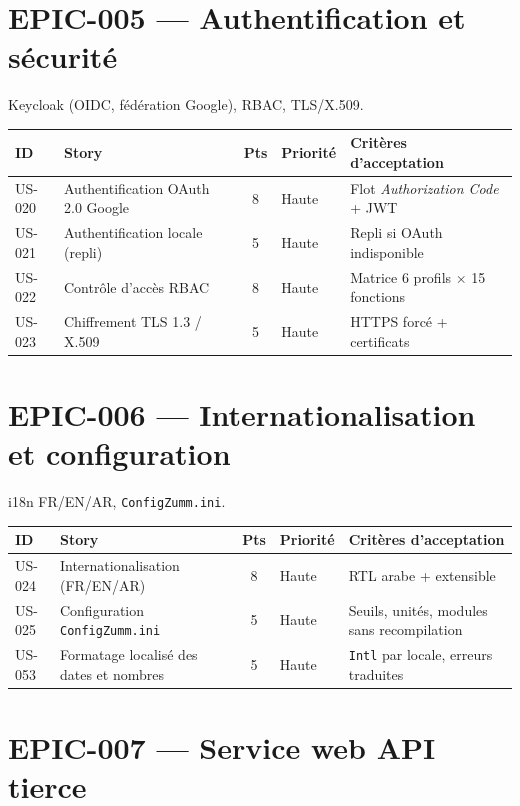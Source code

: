 \section{EPIC-005 --- Authentification et sécurité}

Keycloak (OIDC, fédération Google), RBAC, TLS/X.509.

\begin{center}
\begin{tabular}{lp{6.6cm}cl p{4.6cm}}
\toprule
\textbf{ID} & \textbf{Story} & \textbf{Pts} & \textbf{Priorité} & \textbf{Critères d'acceptation} \\
\midrule
US-020 & Authentification OAuth 2.0 Google & 8 & Haute & Flot \emph{Authorization Code} + JWT \\
US-021 & Authentification locale (repli)   & 5 & Haute & Repli si OAuth indisponible \\
US-022 & Contrôle d'accès RBAC             & 8 & Haute & Matrice 6 profils $\times$ 15 fonctions \\
US-023 & Chiffrement TLS 1.3 / X.509         & 5 & Haute & HTTPS forcé + certificats \\
\bottomrule
\end{tabular}
\end{center}

\section{EPIC-006 --- Internationalisation et configuration}

i18n FR/EN/AR, \texttt{ConfigZumm.ini}.

\begin{center}
\begin{tabular}{lp{6.6cm}cl p{4.6cm}}
\toprule
\textbf{ID} & \textbf{Story} & \textbf{Pts} & \textbf{Priorité} & \textbf{Critères d'acceptation} \\
\midrule
US-024 & Internationalisation (FR/EN/AR) & 8 & Haute & RTL arabe + extensible \\
US-025 & Configuration \texttt{ConfigZumm.ini} & 5 & Haute & Seuils, unités, modules sans recompilation \\
US-053 & Formatage localisé des dates et nombres & 5 & Haute & \texttt{Intl} par locale, erreurs traduites \\
\bottomrule
\end{tabular}
\end{center}

\section{EPIC-007 --- Service web API tierce}

